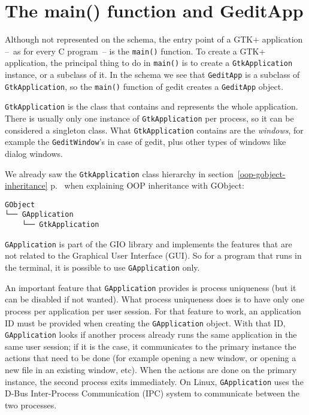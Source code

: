\section{The main() function and GeditApp}

Although not represented on the schema, the entry point of a GTK+ application --~as for every C program~-- is the \lstinline{main()} function. To create a GTK+ application, the principal thing to do in \lstinline{main()} is to create a \lstinline{GtkApplication} instance, or a subclass of it. In the schema we see that \lstinline{GeditApp} is a subclass of \lstinline{GtkApplication}, so the \lstinline{main()} function of gedit creates a \lstinline{GeditApp} object.

\lstinline{GtkApplication} is the class that contains and represents the whole application. There is usually only one instance of \lstinline{GtkApplication} per process, so it can be considered a singleton class. What \lstinline{GtkApplication} contains are the \emph{windows}, for example the \lstinline{GeditWindow}'s in case of gedit, plus other types of windows like dialog windows.

We already saw the \lstinline{GtkApplication} class hierarchy in section~\ref{oop-gobject-inheritance} p.~\pageref{oop-gobject-inheritance} when explaining OOP inheritance with GObject:

\begin{verbatim}
GObject
└── GApplication
    └── GtkApplication
\end{verbatim}

\lstinline{GApplication} is part of the GIO library and implements the features that are not related to the Graphical User Interface (GUI). So for a program that runs in the terminal, it is possible to use \lstinline{GApplication} only.

An important feature that \lstinline{GApplication} provides is process uniqueness (but it can be disabled if not wanted). What process uniqueness does is to have only one process per application per user session. For that feature to work, an application ID must be provided when creating the \lstinline{GApplication} object. With that ID, \lstinline{GApplication} looks if another process already runs the same application in the same user session; if it is the case, it communicates to the primary instance the actions that need to be done (for example opening a new window, or opening a new file in an existing window, etc). When the actions are done on the primary instance, the second process exits immediately. On Linux, \lstinline{GApplication} uses the D-Bus Inter-Process Communication (IPC) system to communicate between the two processes.

